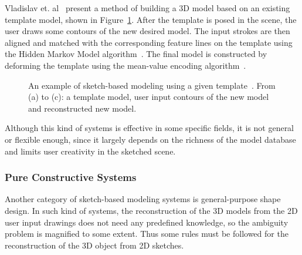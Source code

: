 Vladislav et. al~\cite{KSV09} present a method of building a 3D model based on an existing template model, shown in Figure~\ref{fig:ModelingFromCtrDraw}. After the template is posed in the scene, the user draws some contours of the new desired model. The input strokes are then aligned and matched with the corresponding feature lines on the template using the Hidden Markov Model algorithm~\cite{LR89}. The final model is constructed by deforming the template using the mean-value encoding algorithm~\cite{KS06}.

\begin{figure} [htbp]
  \centering
  \caption{An example of sketch-based modeling using a given template~\cite{KSV09}. From (a) to (c): a template model, user input contours of the new model and reconstructed new model.}
  \label{fig:ModelingFromCtrDraw} %
\end{figure}
Although this kind of systems is effective in some specific fields, it is not general or flexible enough, since it largely depends on the richness of the model database and limits user creativity in the sketched scene.

\subsubsection{Pure Constructive Systems}\label{ch2:sec:sbim:creation:2}

Another category of sketch-based modeling systems is general-purpose shape design. In such kind of systems, the reconstruction of the 3D models from the 2D user input drawings does not need any predefined knowledge, so the ambiguity problem is magnified to some extent. Thus some rules must be followed for the reconstruction of the 3D object from 2D sketches.


